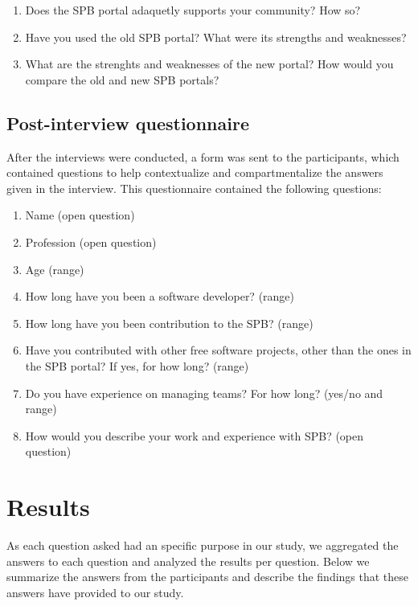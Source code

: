 \documentclass{sigchi}
\begin{document}
\begin{enumerate}
\item Does the SPB portal adaquetly supports your community? How so?
\item Have you used the old SPB portal? What were its strengths and weaknesses?
\item What are the strenghts and weaknesses of the new portal? How would you compare the old and new SPB portals?
\end{enumerate}

\subsection{Post-interview questionnaire}

After the interviews were conducted, a form was sent to the participants, which contained questions to help contextualize and compartmentalize the answers given in the interview. This questionnaire contained the following questions:

\begin{enumerate}
  \item Name (open question)
  \item Profession (open question)
  \item Age (range)
  \item How long have you been a software developer? (range)
  \item How long have you been contribution to the SPB? (range)
  \item Have you contributed with other free software projects, other than the ones in the SPB portal? If yes, for how long? (range)
  \item Do you have experience on managing teams? For how long? (yes/no and range)
  \item How would you describe your work and experience with SPB? (open question) 
\end{enumerate}


%
%
%
%
\section{Results}

As each question asked had an specific purpose in our study, we aggregated the answers to each question and analyzed the results per question. Below we summarize the answers from the participants and describe the findings that these answers have provided to our study.

\end{document}
